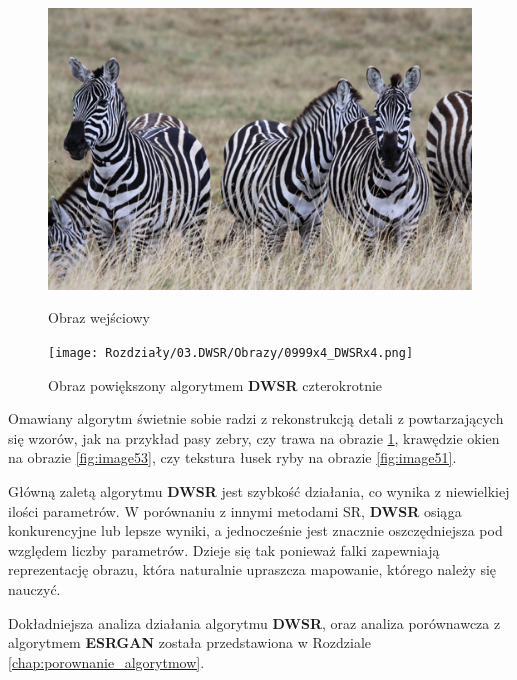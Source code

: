 \begin{figure}[ht]
    \centering
    \begin{minipage}[t]{0.45\linewidth}
        \includegraphics[width=\linewidth]{Rozdziały/03.DWSR/Obrazy/0999x4.png}
        \caption{Obraz wejściowy}
        \label{fig:image54}
    \end{minipage}
    \hspace{0.5cm}
    \begin{minipage}[t]{0.45\linewidth}
        \texttt{[image: Rozdziały/03.DWSR/Obrazy/0999x4\_DWSRx4.png]}
        \caption{Obraz powiększony algorytmem \textbf{DWSR} czterokrotnie}
        \label{fig:image55}
    \end{minipage}
\end{figure}



Omawiany algorytm świetnie sobie radzi z rekonstrukcją detali z powtarzających się wzorów, jak na przykład pasy zebry, czy trawa na obrazie \ref{fig:image55}, krawędzie okien na obrazie \ref{fig:image53}, czy tekstura łusek ryby na obrazie \ref{fig:image51}.

Główną zaletą algorytmu \textbf{DWSR} jest szybkość działania, co wynika z niewielkiej ilości parametrów. W porównaniu z innymi metodami SR, \textbf{DWSR} osiąga konkurencyjne lub lepsze wyniki, a jednocześnie jest znacznie oszczędniejsza pod względem liczby parametrów. Dzieje się tak ponieważ falki zapewniają reprezentację obrazu, która naturalnie upraszcza mapowanie, którego należy się nauczyć. 

Dokładniejsza analiza działania algorytmu \textbf{DWSR}, oraz analiza porównawcza z algorytmem \textbf{ESRGAN} została przedstawiona w Rozdziale \ref{chap:porownanie_algorytmow}.